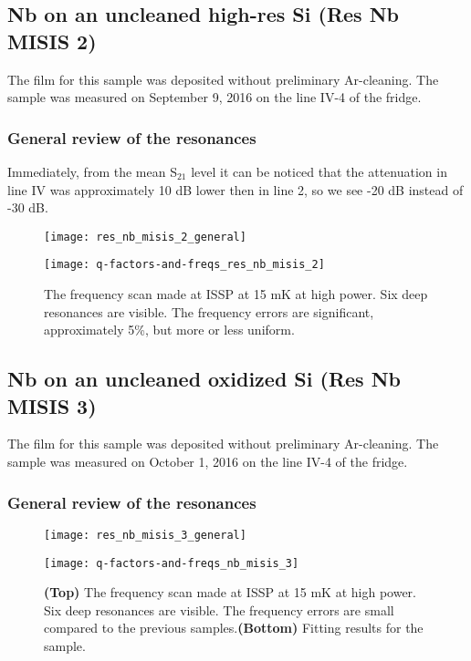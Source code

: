 \documentclass[12pt]{article}
\numberwithin{equation}{section}
\numberwithin{figure}{section}
\begin{document}
\newpage
\subsection{Nb on an uncleaned high-res Si (Res Nb MISIS 2)}

The film for this sample was deposited without preliminary Ar-cleaning. The sample was measured on September 9, 2016 on the line IV-4 of the fridge.

\subsubsection{General review of the resonances}

Immediately, from the mean S$_{21}$ level it can be noticed that the attenuation in line IV was approximately 10 dB lower then in line 2, so we see -20 dB instead of -30 dB.

\begin{figure}[h!]
\centering
\texttt{[image: res\_nb\_misis\_2\_general]}

\vspace{0.5cm}
\texttt{[image: q-factors-and-freqs\_res\_nb\_misis\_2]}

\caption{The frequency scan made at ISSP at 15 mK at high power. Six deep resonances are visible. The frequency errors are significant, approximately 5\%, but more or less uniform.}
\end{figure}

\newpage
\subsection{Nb on an uncleaned oxidized Si (Res Nb MISIS 3)}

The film for this sample was deposited without preliminary Ar-cleaning. The sample was measured on October 1, 2016 on the line IV-4 of the fridge.

\subsubsection{General review of the resonances}

\begin{figure}[h!]
\centering
\texttt{[image: res\_nb\_misis\_3\_general]}

\vspace{0.5cm}
\texttt{[image: q-factors-and-freqs\_nb\_misis\_3]}

\caption{\textbf{(Top)} The frequency scan made at ISSP at 15 mK at high power. Six deep resonances are visible. The frequency errors are small compared to the previous samples.\textbf{(Bottom)} Fitting results for the sample.}
\end{figure}
\end{document}
